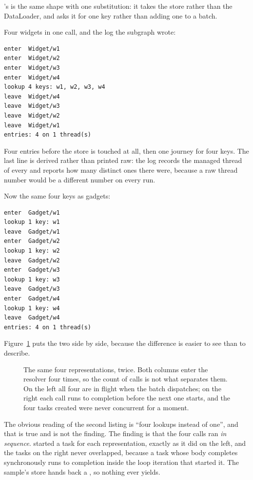 's is the same shape with one substitution: it takes the store
rather than the DataLoader, and asks it for one key rather than adding one to a
batch.

%
Four widgets in one  call, and the log the subgraph wrote:

\begin{verbatim}
enter  Widget/w1
enter  Widget/w2
enter  Widget/w3
enter  Widget/w4
lookup 4 keys: w1, w2, w3, w4
leave  Widget/w4
leave  Widget/w3
leave  Widget/w2
leave  Widget/w1
entries: 4 on 1 thread(s)
\end{verbatim}

Four entries before the store is touched at all, then one journey for four
keys. The last line is derived rather than printed raw: the log records the
managed thread of every  and reports how many distinct ones there
were, because a raw thread number would be a different number on every run.

Now the same four keys as gadgets:

\begin{verbatim}
enter  Gadget/w1
lookup 1 key: w1
leave  Gadget/w1
enter  Gadget/w2
lookup 1 key: w2
leave  Gadget/w2
enter  Gadget/w3
lookup 1 key: w3
leave  Gadget/w3
enter  Gadget/w4
lookup 1 key: w4
leave  Gadget/w4
entries: 4 on 1 thread(s)
\end{verbatim}

Figure~\ref{fig:ch11-batch-timeline} puts the two side by side, because the
difference is easier to see than to describe.

\begin{figure}[htbp]
  \centering
  
  \caption{The same four representations, twice. Both columns enter the
  resolver four times, so the count of calls is not what separates them. On the
  left all four are in flight when the batch dispatches; on the right each call
  runs to completion before the next one starts, and the four tasks
   created were never concurrent for a moment.}
  \label{fig:ch11-batch-timeline}
\end{figure}

%
The obvious reading of the second listing is \enquote{four lookups instead of
one}, and that is true and is not the finding. The finding is that the four
calls ran \emph{in sequence}.  started a task for each
representation, exactly as it did on the left, and the tasks on the right never
overlapped, because a task whose body completes synchronously runs to
completion inside the loop iteration that started it. The sample's store hands
back a , so nothing ever yields.

